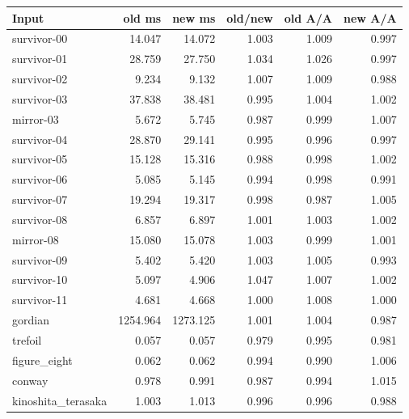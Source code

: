 \begin{center}\small
\begin{tabular}{@{}lrrrrr@{}}
\toprule
Input & old ms & new ms & old/new & old A/A & new A/A \\
\midrule
survivor-00 & 14.047 & 14.072 & 1.003 & 1.009 & 0.997 \\
survivor-01 & 28.759 & 27.750 & 1.034 & 1.026 & 0.997 \\
survivor-02 & 9.234 & 9.132 & 1.007 & 1.009 & 0.988 \\
survivor-03 & 37.838 & 38.481 & 0.995 & 1.004 & 1.002 \\
mirror-03 & 5.672 & 5.745 & 0.987 & 0.999 & 1.007 \\
survivor-04 & 28.870 & 29.141 & 0.995 & 0.996 & 0.997 \\
survivor-05 & 15.128 & 15.316 & 0.988 & 0.998 & 1.002 \\
survivor-06 & 5.085 & 5.145 & 0.994 & 0.998 & 0.991 \\
survivor-07 & 19.294 & 19.317 & 0.998 & 0.987 & 1.005 \\
survivor-08 & 6.857 & 6.897 & 1.001 & 1.003 & 1.002 \\
mirror-08 & 15.080 & 15.078 & 1.003 & 0.999 & 1.001 \\
survivor-09 & 5.402 & 5.420 & 1.003 & 1.005 & 0.993 \\
survivor-10 & 5.097 & 4.906 & 1.047 & 1.007 & 1.002 \\
survivor-11 & 4.681 & 4.668 & 1.000 & 1.008 & 1.000 \\
gordian & 1254.964 & 1273.125 & 1.001 & 1.004 & 0.987 \\
trefoil & 0.057 & 0.057 & 0.979 & 0.995 & 0.981 \\
figure\_eight & 0.062 & 0.062 & 0.994 & 0.990 & 1.006 \\
conway & 0.978 & 0.991 & 0.987 & 0.994 & 1.015 \\
kinoshita\_terasaka & 1.003 & 1.013 & 0.996 & 0.996 & 0.988 \\
\bottomrule
\end{tabular}
\end{center}
